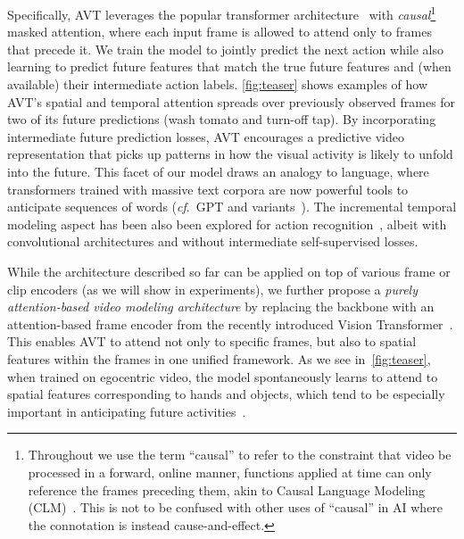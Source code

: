 \documentclass[10pt,twocolumn,letterpaper]{article}
\newcommand{\method}{AVT\xspace}
\begin{document}
Specifically, \method leverages the popular transformer architecture~\cite{vaswani2017attention,wang2019learning} 
with {\em causal}\footnote{Throughout we use the term ``causal'' to refer to the constraint that video be processed in a forward, online manner, \ie functions applied at time  can only reference the frames preceding them, 
akin to Causal Language Modeling (CLM)~\cite{lample2019cross}.
This is not to be confused with other uses of ``causal'' in AI where the connotation is instead cause-and-effect.}
masked attention, where each input frame is allowed to attend only to frames that precede it. We train the model to jointly predict the next action while also learning to predict future features that match the true future features and (when available) their intermediate action labels.
\cref{fig:teaser} shows examples of how \method{}'s spatial and temporal attention spreads over previously observed frames for two of its future predictions (wash tomato and turn-off tap). 
By incorporating intermediate future prediction losses, \method encourages a predictive
video representation that picks up patterns in how the visual activity is likely to unfold into the future.
This facet of our model draws an analogy to language, where transformers trained with massive text corpora are now powerful tools to anticipate sequences of words (\emph{cf}.~GPT and variants~\cite{radford2018improving,radford2019language,brown2020language}). The incremental temporal modeling aspect has been also been explored for action recognition~\cite{li2020directional}, albeit with convolutional architectures and without  intermediate self-supervised losses.







While the architecture described so far can be applied on top of various frame or clip encoders (as we will show in experiments), we further propose a  \emph{purely attention-based video modeling architecture} by replacing the backbone with an attention-based frame encoder from the recently introduced Vision Transformer~\cite{dosovitskiy2021image}. This enables \method to attend not only to specific frames, but also to spatial features within the frames in one unified framework. As we see in~\cref{fig:teaser}, when trained on egocentric video, the model spontaneously learns to attend to spatial features corresponding to hands and objects, which tend to be especially important in anticipating future activities~\cite{liu2020forecasting}. 
\end{document}

